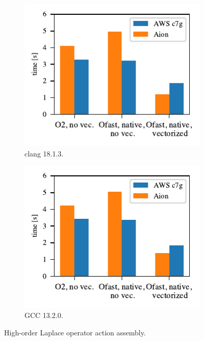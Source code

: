 \begin{figure}
    \begin{subfigure}{.5\textwidth}
        \centering
        \includegraphics{chapters/chp1/graphics/kernel_plots/local_operator_clang_deg8.pdf}
        \caption{clang 18.1.3.}
        \label{fig:local-clang-deg8}
    \end{subfigure}%
    \begin{subfigure}{.5\textwidth}
        \centering
        \includegraphics{chapters/chp1/graphics/kernel_plots/local_operator_gcc_deg8.pdf}
        \caption{GCC 13.2.0.}
        \label{fig:local-gcc-deg8}
    \end{subfigure}
    \caption{High-order Laplace operator action assembly.}
    \label{fig:local-deg8}
\end{figure}

